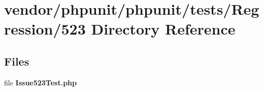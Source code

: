 \section{vendor/phpunit/phpunit/tests/\+Regression/523 Directory Reference}
\label{dir_96252abbb189266ca079eb2f51f8d7fc}
\subsection*{Files}
\begin{DoxyCompactItemize}
\item 
file {\bf Issue523\+Test.\+php}
\end{DoxyCompactItemize}
